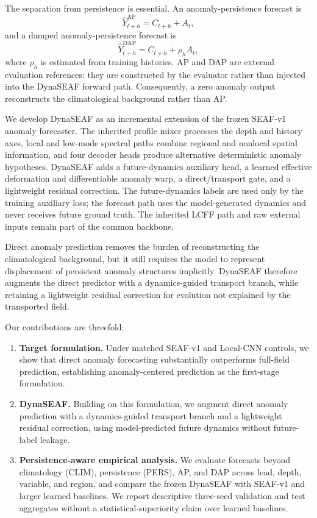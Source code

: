 \documentclass[conference]{IEEEtran}
\begin{document}
The separation from persistence is essential. An anomaly-persistence forecast is
\begin{equation}
\widehat{Y}^{\mathrm{AP}}_{t+h}=C_{t+h}+A_t,
\label{eq:intro_ap}
\end{equation}
and a damped anomaly-persistence forecast is
\begin{equation}
\widehat{Y}^{\mathrm{DAP}}_{t+h}=C_{t+h}+\rho_h A_t,
\label{eq:intro_dap}
\end{equation}
where $\rho_h$ is estimated from training histories. AP and DAP are external evaluation references: they are constructed by the evaluator rather than injected into the DynaSEAF forward path. Consequently, a zero anomaly output reconstructs the climatological background rather than AP.

We develop DynaSEAF as an incremental extension of the frozen SEAF-v1 anomaly forecaster. The inherited profile mixer processes the depth and history axes, local and low-mode spectral paths combine regional and nonlocal spatial information, and four decoder heads produce alternative deterministic anomaly hypotheses. DynaSEAF adds a future-dynamics auxiliary head, a learned effective deformation and differentiable anomaly warp, a direct/transport gate, and a lightweight residual correction. The future-dynamics labels are used only by the training auxiliary loss; the forecast path uses the model-generated dynamics and never receives future ground truth. The inherited LCFF path and raw external inputs remain part of the common backbone.

Direct anomaly prediction removes the burden of reconstructing the climatological background, but it still requires the model to represent displacement of persistent anomaly structures implicitly. DynaSEAF therefore augments the direct predictor with a dynamics-guided transport branch, while retaining a lightweight residual correction for evolution not explained by the transported field.

Our contributions are threefold:
\begin{enumerate}
    \item \textbf{Target formulation.} Under matched SEAF-v1 and Local-CNN controls, we show that direct anomaly forecasting substantially outperforms full-field prediction, establishing anomaly-centered prediction as the first-stage formulation.
    \item \textbf{DynaSEAF.} Building on this formulation, we augment direct anomaly prediction with a dynamics-guided transport branch and a lightweight residual correction, using model-predicted future dynamics without future-label leakage.
    \item \textbf{Persistence-aware empirical analysis.} We evaluate forecasts beyond climatology (CLIM), persistence (PERS), AP, and DAP across lead, depth, variable, and region, and compare the frozen DynaSEAF with SEAF-v1 and larger learned baselines. We report descriptive three-seed validation and test aggregates without a statistical-superiority claim over learned baselines.
\end{enumerate}
\end{document}

